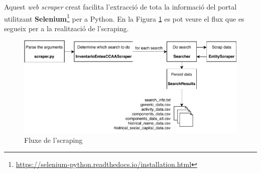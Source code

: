 \documentclass[12pt]{article}
\begin{document}
Aquest \textit{web scraper} creat facilita l'extracció de tota la informació del portal utilitzant \textbf{Selenium}\footnote{\url{https://selenium-python.readthedocs.io/installation.html}} per a Python. En la Figura \ref{flowchart} es pot veure el flux que es segueix per a la realització de l'scraping.

\begin{figure}[H]
    \centering
    \includegraphics[width=1\columnwidth]{img/flowchart.pdf}
    \caption{Fluxe de l'scraping} 
    \label{flowchart}
\end{figure}
\end{document}
